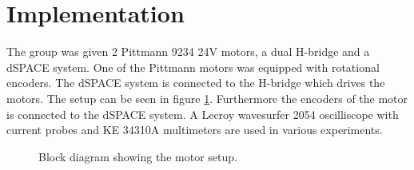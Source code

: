 \section{Implementation}
The group was given 2 Pittmann 9234 24V motors, a dual H-bridge and a dSPACE system. 
One of the Pittmann motors was equipped with rotational encoders.
The dSPACE system is connected to the H-bridge which drives the motors. 
The setup can be seen in figure \ref{fig:implementation_block}.
Furthermore the encoders of the motor is connected to the dSPACE system.
A Lecroy wavesurfer 2054 oscilliscope with current probes and KE 34310A multimeters are used in various experiments.

\begin{figure}[!h]
\centering

  \caption{Block diagram showing the motor setup.}
  \label{fig:implementation_block}
\end{figure}


